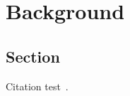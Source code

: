 \chapter{Background}\label{chapter:introduction}

\section{Section}
Citation test~\parencite{latex}.